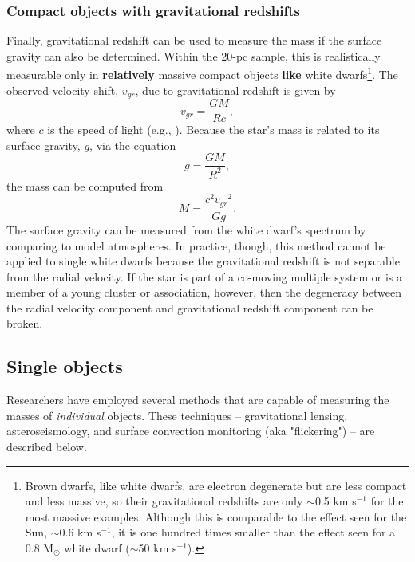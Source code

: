 \documentclass[twocolumn,tighten,twocolappendix]{aastex631}
\begin{document}
\subsubsection{Compact objects with gravitational redshifts}

Finally, gravitational redshift can be used to measure the mass if the surface gravity can also be determined. Within the 20-pc sample, this is realistically measurable only in {\bf relatively} massive compact objects {\bf like} white dwarfs\footnote{Brown dwarfs, like white dwarfs, are electron degenerate but are less compact and less massive, so their gravitational redshifts are only $\sim$0.5 km s$^{-1}$ for the most massive examples. Although this is comparable to the effect seen for the Sun, $\sim$0.6 km s$^{-1}$, it is one hundred times smaller than the effect seen for a 0.8 M$_\odot$ white dwarf ($\sim$50 km s$^{-1}$).}. The observed velocity shift, $v_{gr}$, due to gravitational redshift is given by
\begin{equation}
   v_{gr} = \frac{GM}{Rc},
\end{equation}
where $c$ is the speed of light (e.g., \citealt{chandra2020}). Because the star's mass is related to its surface gravity, $g$, via the equation
\begin{equation}
\label{eqn:surface_gravity}
    g = \frac{GM}{R^2},
\end{equation}
the mass can be computed from
\begin{equation}
   M = \frac{c^2{v_{gr}}^2}{Gg}.
\end{equation}
The surface gravity can be measured from the white dwarf's spectrum by comparing to model atmospheres. In practice, though, this method cannot be applied to single white dwarfs because the gravitational redshift is not separable from the radial velocity. If the star is part of a co-moving multiple system or is a member of a young cluster or association, however, then the degeneracy between the radial velocity component and gravitational redshift component can be broken.


\subsection{Single objects} 

Researchers have employed several methods that are capable of measuring the masses of {\it individual} objects. These techniques -- gravitational lensing, asteroseismology, and surface convection monitoring (aka "flickering") -- are described below.
\end{document}
